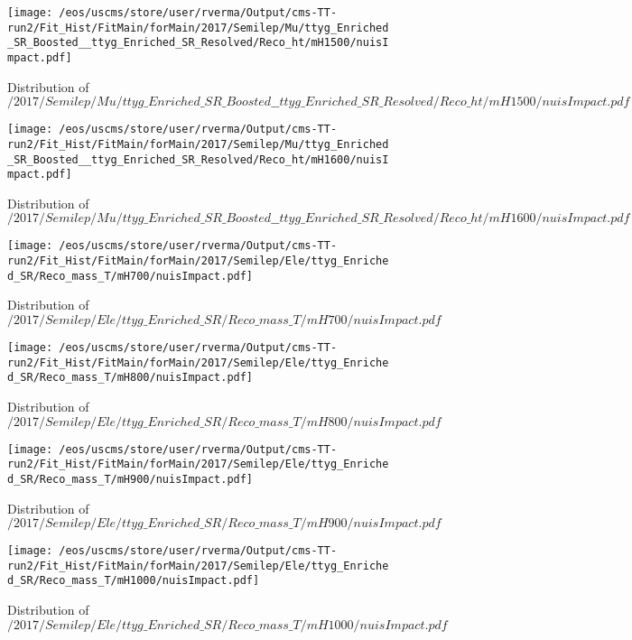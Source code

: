 \begin{figure}
\centering
\texttt{[image: /eos/uscms/store/user/rverma/Output/cms-TT-run2/Fit\_Hist/FitMain/forMain/2017/Semilep/Mu/ttyg\_Enriched\_SR\_Boosted\_\_ttyg\_Enriched\_SR\_Resolved/Reco\_ht/mH1500/nuisImpact.pdf]}
\caption{Distribution of $/2017/Semilep/Mu/ttyg\_Enriched\_SR\_Boosted\_\_ttyg\_Enriched\_SR\_Resolved/Reco\_ht/mH1500/nuisImpact.pdf$}
\end{figure}

\begin{figure}
\centering
\texttt{[image: /eos/uscms/store/user/rverma/Output/cms-TT-run2/Fit\_Hist/FitMain/forMain/2017/Semilep/Mu/ttyg\_Enriched\_SR\_Boosted\_\_ttyg\_Enriched\_SR\_Resolved/Reco\_ht/mH1600/nuisImpact.pdf]}
\caption{Distribution of $/2017/Semilep/Mu/ttyg\_Enriched\_SR\_Boosted\_\_ttyg\_Enriched\_SR\_Resolved/Reco\_ht/mH1600/nuisImpact.pdf$}
\end{figure}

\begin{figure}
\centering
\texttt{[image: /eos/uscms/store/user/rverma/Output/cms-TT-run2/Fit\_Hist/FitMain/forMain/2017/Semilep/Ele/ttyg\_Enriched\_SR/Reco\_mass\_T/mH700/nuisImpact.pdf]}
\caption{Distribution of $/2017/Semilep/Ele/ttyg\_Enriched\_SR/Reco\_mass\_T/mH700/nuisImpact.pdf$}
\end{figure}

\begin{figure}
\centering
\texttt{[image: /eos/uscms/store/user/rverma/Output/cms-TT-run2/Fit\_Hist/FitMain/forMain/2017/Semilep/Ele/ttyg\_Enriched\_SR/Reco\_mass\_T/mH800/nuisImpact.pdf]}
\caption{Distribution of $/2017/Semilep/Ele/ttyg\_Enriched\_SR/Reco\_mass\_T/mH800/nuisImpact.pdf$}
\end{figure}

\begin{figure}
\centering
\texttt{[image: /eos/uscms/store/user/rverma/Output/cms-TT-run2/Fit\_Hist/FitMain/forMain/2017/Semilep/Ele/ttyg\_Enriched\_SR/Reco\_mass\_T/mH900/nuisImpact.pdf]}
\caption{Distribution of $/2017/Semilep/Ele/ttyg\_Enriched\_SR/Reco\_mass\_T/mH900/nuisImpact.pdf$}
\end{figure}

\begin{figure}
\centering
\texttt{[image: /eos/uscms/store/user/rverma/Output/cms-TT-run2/Fit\_Hist/FitMain/forMain/2017/Semilep/Ele/ttyg\_Enriched\_SR/Reco\_mass\_T/mH1000/nuisImpact.pdf]}
\caption{Distribution of $/2017/Semilep/Ele/ttyg\_Enriched\_SR/Reco\_mass\_T/mH1000/nuisImpact.pdf$}
\end{figure}

